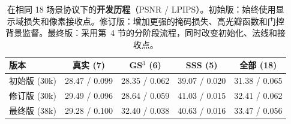 \begin{table}[t]
\caption{\ours 在相同 18 场景协议下的\textbf{开发历程}（PSNR / LPIPS）。初始版：始终使用显示域损失和像素接收点。修订版：增加更强的掩码损失、高光瓣函数和门控背景监督。最终版：采用第~4 节的分阶段流程，同时改变初始化、法线和接收点。}
\label{tab:supp_history}
\centering\scriptsize
\setlength{\tabcolsep}{2.5pt}
\begin{tabular}{@{}lcccc@{}}
\toprule
版本 & 真实 (7) & GS$^3$ (6) & SSS (5) & 全部 (18) \\
\midrule
初始版 (30k) & 28.47 / 0.099 & 28.35 / 0.062 & 39.07 / 0.020 & 31.38 / 0.065 \\
修订版 (30k) & 29.49 / 0.096 & 28.64 / 0.059 & 41.03 / 0.015 & 32.41 / 0.062 \\
最终版 (38k) & 29.28 / 0.100 & 32.40 / 0.038 & 40.63 / 0.016 & 33.47 / 0.056 \\
\bottomrule
\end{tabular}
\end{table}
